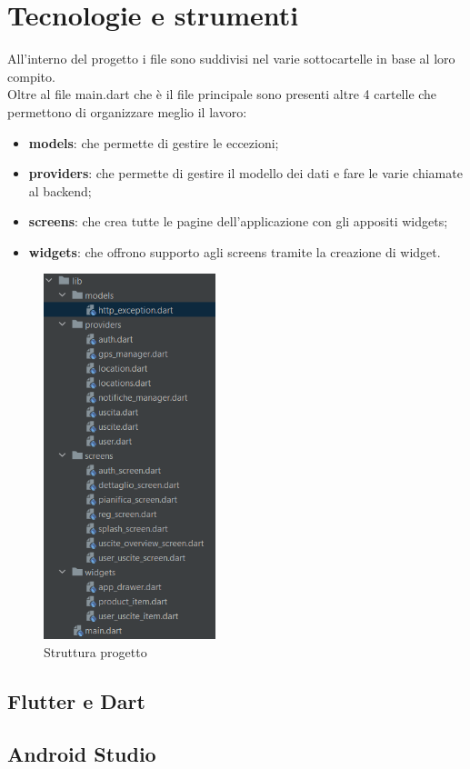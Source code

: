 \section{Tecnologie e strumenti}
All'interno del progetto i file sono suddivisi nel varie sottocartelle in base al loro compito.\\
Oltre al file main.dart che è il file principale sono presenti altre 4 cartelle che permettono di organizzare meglio il lavoro:
\begin{itemize}
	\item \textbf{models}: che permette di gestire le eccezioni;
	\item \textbf{providers}: che permette di gestire il modello dei dati e fare le varie chiamate al backend;
	\item \textbf{screens}: che crea tutte le pagine dell'applicazione con gli appositi widgets;
	\item \textbf{widgets}: che offrono supporto agli screens tramite la creazione di widget.
\end{itemize}
\begin{figure}[htbp]	
	\centering
	\includegraphics[width=5cm]{immagini/struttura.png}
	\caption{Struttura progetto}
	\label{fig:Struttura progetto}
\end{figure}

\subsection{Flutter e Dart}

\subsection{Android Studio}

